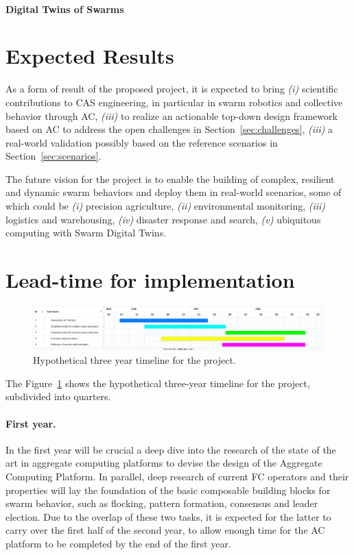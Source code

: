 \documentclass[12pt]{article}
\begin{document}
\paragraph{Digital Twins of Swarms}

\section{Expected Results}
As a form of result of the proposed project, it is expected to bring \textit{(i)} scientific contributions to CAS engineering, in particular in swarm robotics and collective behavior through AC,
\textit{(iii)} to realize an actionable top-down design framework based on AC to address the open challenges in Section~\ref{sec:challenges}, \textit{(iii)} a real-world validation possibly based on the reference scenarios in Section~\ref{sec:scenarios}.

The future vision for the project is to enable the building of complex, resilient and dynamic swarm behaviors and deploy them in real-world scenarios, some of which could be \textit{(i)} precision agriculture,
\textit{(ii)} environmental monitoring, \textit{(iii)} logistics and warehousing, \textit{(iv)} disaster response and search, 
\textit{(v)} ubiquitous computing with Swarm Digital Twins.

\section{Lead-time for implementation}
\begin{figure}
	\includegraphics[width=\linewidth]{figures/timeline.png}
	\caption{Hypothetical three year timeline for the project.}
	\label{fig:timeline}
\end{figure}

The Figure~\ref{fig:timeline} shows the hypothetical three-year timeline for the project, subdivided into quarters.

\paragraph{First year.} In the first year will be crucial a deep dive into the research of the state of the art in aggregate computing platforms to devise the design of the Aggregate Computing Platform.
In parallel, deep research of current FC operators and their properties will lay the foundation of the basic composable building blocks for swarm behavior, such as flocking, pattern formation, consensus and leader election.
Due to the overlap of these two tasks, it is expected for the latter to carry over the first half of the second year, to allow enough time for the AC platform to be completed by the end of the first year.
\end{document}
